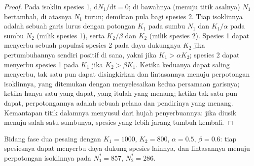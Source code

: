 \begin{proof}
Pada isoklin spesies 1, $\mathrm{d}N_1/\mathrm{d}t = 0$; di bawahnya
(menuju titik asalnya) $N_1$ bertambah, di atasnya $N_1$ turun;
demikian pula bagi spesies 2. Tiap isoklinnya adalah sebuah garis lurus
dengan potongan $K_1$ pada sumbu $N_1$ dan $K_1/\alpha$ pada sumbu
$N_2$ (milik spesies 1), serta $K_2/\beta$ dan $K_2$ (milik spesies 2).
Spesies 1 dapat menyerbu sebuah populasi spesies 2 pada daya dukungnya
$K_2$ jika pertumbuhannya sendiri positif di sana, yakni jika $K_1 > \alpha K_2$; spesies 2 dapat menyerbu spesies 1 pada $K_1$ jika $K_2 > \beta K_1$. Ketika keduanya dapat saling menyerbu, tak satu pun dapat
disingkirkan dan lintasannya menuju perpotongan isoklinnya, yang
ditemukan dengan menyelesaikan kedua persamaan garisnya; ketika hanya
satu yang dapat, yang itulah yang menang; ketika tak satu pun dapat,
perpotongannya adalah sebuah pelana dan pendirinya yang menang.
Kemantapan titik dalamnya menyusul dari hujah penyerbuannya: jika
diusik menuju salah satu sumbunya, spesies yang lebih jarang tumbuh
kembali.
\end{proof}

\begin{omfigure}

{\small Bidang fase dua pesaing dengan $K_1 = 1000$, $K_2 =
800$, $\alpha = 0.5$, $\beta = 0.6$: tiap spesiesnya dapat menyerbu daya
dukung spesies lainnya, dan lintasannya menuju perpotongan isoklinnya
pada $N_1^{*} = 857$, $N_2^{*} = 286$.}
\end{omfigure}

